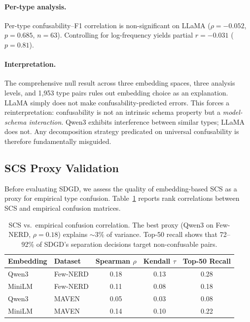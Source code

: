 \documentclass[11pt,a4paper]{article}
\begin{document}
\paragraph{Per-type analysis.} Per-type confusability--F1 correlation is non-significant on LLaMA ($\rho{=}{-}0.052$, $p{=}0.685$, $n{=}63$). Controlling for log-frequency yields partial $r{=}{-}0.031$ ($p{=}0.81$).

\paragraph{Interpretation.} The comprehensive null result across three embedding spaces, three analysis levels, and 1,953 type pairs rules out embedding choice as an explanation. LLaMA simply does not make confusability-predicted errors. This forces a reinterpretation: confusability is not an intrinsic schema property but a \emph{model-schema interaction}. Qwen3 exhibits interference between similar types; LLaMA does not. Any decomposition strategy predicated on universal confusability is therefore fundamentally misguided.

\subsection{SCS Proxy Validation}
\label{sec:proxy}

Before evaluating SDGD, we assess the quality of embedding-based SCS as a proxy for empirical type confusion. Table~\ref{tab:scs_proxy} reports rank correlations between SCS and empirical confusion matrices.

\begin{table}[t]
\centering
\small
\begin{tabular}{llccc}
\toprule
Embedding & Dataset & Spearman $\rho$ & Kendall $\tau$ & Top-50 Recall \\
\midrule
Qwen3 & Few-NERD & 0.18 & 0.13 & 0.28 \\
MiniLM & Few-NERD & 0.11 & 0.08 & 0.18 \\
Qwen3 & MAVEN & 0.05 & 0.03 & 0.08 \\
MiniLM & MAVEN & 0.14 & 0.10 & 0.22 \\
\bottomrule
\end{tabular}
\caption{SCS vs.\ empirical confusion correlation. The best proxy (Qwen3 on Few-NERD, $\rho{=}0.18$) explains ${\sim}3\%$ of variance. Top-50 recall shows that 72--92\% of SDGD's separation decisions target non-confusable pairs.}
\label{tab:scs_proxy}
\end{table}
\end{document}
